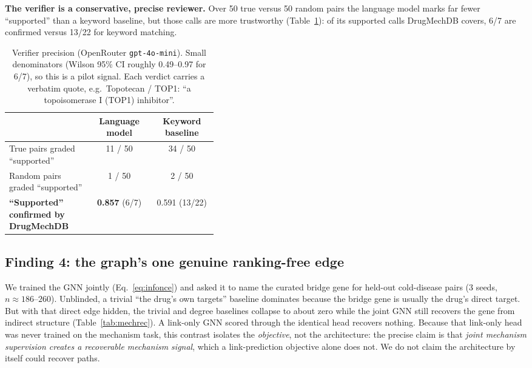 \documentclass[11pt]{article}
\begin{document}
\textbf{The verifier is a conservative, precise reviewer.} Over 50 true versus 50 random
pairs the language model marks far fewer ``supported'' than a keyword baseline, but those
calls are more trustworthy (Table~\ref{tab:verify}): of its supported calls DrugMechDB
covers, 6/7 are confirmed versus 13/22 for keyword matching.

\begin{table}[H]
\centering\small
\begin{tabular}{>{\raggedright\arraybackslash}p{0.40\linewidth} cc}
\toprule
\rowcolor{sriblue}\color{white}\textbf{} & \color{white}\textbf{Language model} & \color{white}\textbf{Keyword baseline}\\
\midrule
\rowcolor{srirow} True pairs graded ``supported'' & 11 / 50 & 34 / 50\\
Random pairs graded ``supported'' & 1 / 50 & 2 / 50\\
\rowcolor{srirow} \textbf{``Supported'' confirmed by DrugMechDB} & \textbf{0.857} (6/7) & 0.591 (13/22)\\
\bottomrule
\end{tabular}
\caption{Verifier precision (OpenRouter \texttt{gpt-4o-mini}). Small denominators (Wilson
95\% CI roughly 0.49--0.97 for 6/7), so this is a pilot signal. Each verdict carries a
verbatim quote, e.g.\ Topotecan / TOP1: ``a topoisomerase I (TOP1) inhibitor''.}
\label{tab:verify}
\end{table}

\subsection{Finding 4: the graph's one genuine ranking-free edge}
We trained the GNN jointly (Eq.~\ref{eq:infonce}) and asked it to name the curated bridge
gene for held-out cold-disease pairs (3 seeds, $n\approx186$--$260$). Unblinded, a trivial
``the drug's own targets'' baseline dominates because the bridge gene is usually the drug's
direct target. But with that direct edge hidden, the trivial and degree baselines collapse
to about zero while the joint GNN still recovers the gene from indirect structure
(Table~\ref{tab:mechrec}). A link-only GNN scored through the identical head recovers
nothing. Because that link-only head was never trained on the mechanism task, this contrast
isolates the \emph{objective}, not the architecture: the precise claim is that
\emph{joint mechanism supervision creates a recoverable mechanism signal}, which a
link-prediction objective alone does not. We do not claim the architecture by itself could
recover paths.
\end{document}
